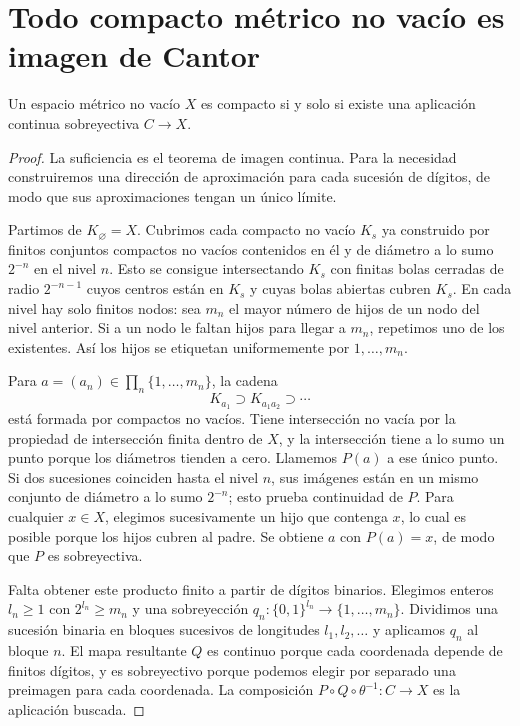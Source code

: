 \section{Todo compacto métrico no vacío es imagen de Cantor}
\begin{teorema}\label{ch16:imagenCantor}
Un espacio métrico no vacío $X$ es compacto si y solo si existe una aplicación continua sobreyectiva $C\to X$.
\end{teorema}
\begin{proof}
La suficiencia es el teorema de imagen continua. Para la necesidad construiremos una dirección de aproximación para cada sucesión de dígitos, de modo que sus aproximaciones tengan un único límite.

Partimos de $K_{\varnothing}=X$. Cubrimos cada compacto no vacío $K_s$ ya construido por finitos conjuntos compactos no vacíos contenidos en él y de diámetro a lo sumo $2^{-n}$ en el nivel $n$. Esto se consigue intersectando $K_s$ con finitas bolas cerradas de radio $2^{-n-1}$ cuyos centros están en $K_s$ y cuyas bolas abiertas cubren $K_s$. En cada nivel hay solo finitos nodos: sea $m_n$ el mayor número de hijos de un nodo del nivel anterior. Si a un nodo le faltan hijos para llegar a $m_n$, repetimos uno de los existentes. Así los hijos se etiquetan uniformemente por $1,\ldots,m_n$.

Para $a=(a_n)\in\prod_n\{1,\ldots,m_n\}$, la cadena
\[
K_{a_1}\supset K_{a_1a_2}\supset\cdots
\]
está formada por compactos no vacíos. Tiene intersección no vacía por la propiedad de intersección finita dentro de $X$, y la intersección tiene a lo sumo un punto porque los diámetros tienden a cero. Llamemos $P(a)$ a ese único punto. Si dos sucesiones coinciden hasta el nivel $n$, sus imágenes están en un mismo conjunto de diámetro a lo sumo $2^{-n}$; esto prueba continuidad de $P$. Para cualquier $x\in X$, elegimos sucesivamente un hijo que contenga $x$, lo cual es posible porque los hijos cubren al padre. Se obtiene $a$ con $P(a)=x$, de modo que $P$ es sobreyectiva.

Falta obtener este producto finito a partir de dígitos binarios. Elegimos enteros $l_n\ge1$ con $2^{l_n}\ge m_n$ y una sobreyección $q_n:\{0,1\}^{l_n}\to\{1,\ldots,m_n\}$. Dividimos una sucesión binaria en bloques sucesivos de longitudes $l_1,l_2,\ldots$ y aplicamos $q_n$ al bloque $n$. El mapa resultante $Q$ es continuo porque cada coordenada depende de finitos dígitos, y es sobreyectivo porque podemos elegir por separado una preimagen para cada coordenada. La composición $P\circ Q\circ\theta^{-1}:C\to X$ es la aplicación buscada.
\end{proof}

